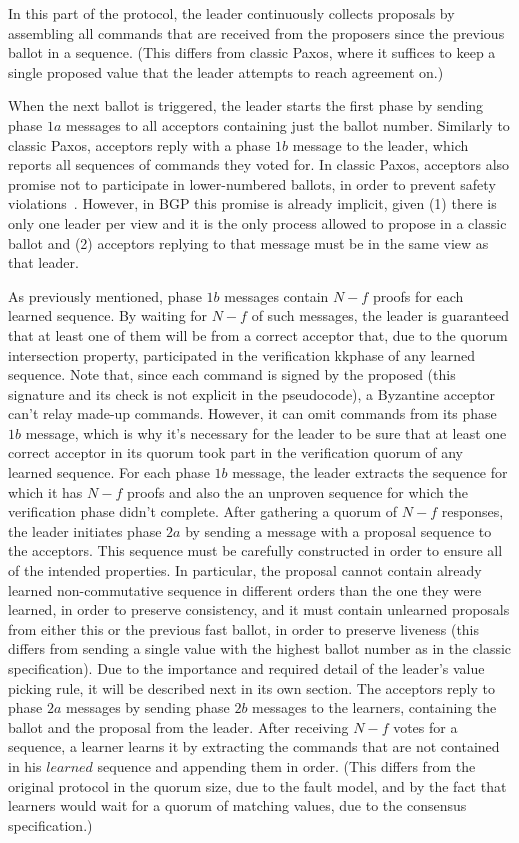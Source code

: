 In this part of the protocol, the leader continuously collects proposals by assembling all commands that are received from the proposers since the previous ballot in a sequence. (This differs from classic Paxos, where it suffices to keep a single proposed value that the leader attempts to reach agreement on.)

When the next ballot is triggered, the leader starts the first phase by sending phase $1a$ messages to all acceptors containing just the ballot number. Similarly to classic Paxos, acceptors reply with a phase $1b$ message to the leader, which reports all sequences of commands they voted for. In classic Paxos, acceptors also promise not to participate in lower-numbered ballots, in order to prevent safety violations~\cite{Lam98}. However, in BGP this promise is already implicit, given (1) there is only one leader per view and it is the only process allowed to propose in a classic ballot and (2) acceptors replying to that message must be in the same view as that leader.

As previously mentioned, phase $1b$ messages contain $N-f$ proofs for each learned sequence. By waiting for $N-f$ of such messages, the leader is guaranteed that at least one of them will be from a correct acceptor that, due to the quorum intersection property, participated in the verification kkphase of any learned sequence. Note that, since each command is signed by the proposed (this signature and its check is not explicit in the pseudocode), a Byzantine acceptor can't relay made-up commands. However, it can omit commands from its phase $1b$ message, which is why it's necessary for the leader to be sure that at least one correct acceptor in its quorum took part in the verification quorum of any learned sequence. For each phase $1b$ message, the leader extracts the sequence for which it has $N-f$ proofs and also the an unproven sequence for which the verification phase didn't complete. After gathering a quorum of $N-f$ responses, the leader initiates phase $2a$ by sending a message with a proposal sequence to the acceptors. This sequence must be carefully constructed in order to ensure all of the intended properties. In particular, the proposal cannot contain already learned non-commutative sequence in different orders than the one they were learned, in order to preserve consistency, and it must contain unlearned proposals from either this or the previous fast ballot, in order to preserve liveness (this differs from sending a single value with the highest ballot number as in the classic specification). Due to the importance and required detail of the leader's value picking rule, it will be described next in its own section. The acceptors reply to phase $2a$ messages by sending phase $2b$ messages to the learners, containing the ballot and the proposal from the leader. After receiving $N-f$ votes for a sequence, a learner learns it by extracting the commands that are not contained in his $learned$ sequence and appending them in order. (This differs from the original protocol in the quorum size, due to the fault model, and by the fact that learners would wait for a quorum of matching values, due to the consensus specification.)\par

